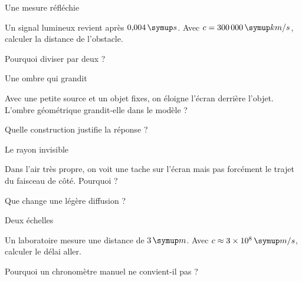 \clearpage{}
\par\noindent\begin{minipage}{\linewidth}
\begin{exercice}[3]{Une mesure réfléchie}
\begin{questions}
\item Un signal lumineux revient après $0{,}004\unite s$. Avec $c=300\,000\unite{km/s}$, calculer la distance de l’obstacle.
\item Pourquoi diviser par deux ?
\end{questions}
\end{exercice}
\end{minipage}
\par\noindent\begin{minipage}{\linewidth}
\begin{exercice}[3]{Une ombre qui grandit}
\begin{questions}
\item Avec une petite source et un objet fixes, on éloigne l’écran derrière l’objet. L’ombre géométrique grandit-elle dans le modèle ?
\item Quelle construction justifie la réponse ?
\end{questions}
\end{exercice}
\end{minipage}
\par\noindent\begin{minipage}{\linewidth}
\begin{exercice}[3]{Le rayon invisible}
\begin{questions}
\item Dans l’air très propre, on voit une tache sur l’écran mais pas forcément le trajet du faisceau de côté. Pourquoi ?
\item Que change une légère diffusion ?
\end{questions}
\end{exercice}
\end{minipage}
\par\noindent\begin{minipage}{\linewidth}
\begin{exercice}[3]{Deux échelles}
\begin{questions}
\item Un laboratoire mesure une distance de $3\unite m$. Avec $c\approx3\times10^8\unite{m/s}$, calculer le délai aller.
\item Pourquoi un chronomètre manuel ne convient-il pas ?
\end{questions}
\end{exercice}
\end{minipage}
